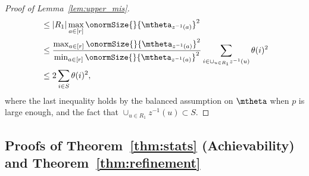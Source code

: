 \documentclass[lettersize,onecolumn,journal]{IEEEtran}
\theoremstyle{definition}
\theoremstyle{definition}
\begin{document}
\begin{proof}[Proof of Lemma~\ref{lem:upper_mis}]
\begin{align}
    & \leq |R_1| \max_{a \in [r]} \onormSize{}{\mtheta_{z^{-1}(a)}}^2  \\
    & \leq {\max_{a \in [r]} \onormSize{}{\mtheta_{z^{-1}(a)}}^2 \over \min_{a \in [r]} \onormSize{}{\mtheta_{z^{-1}(a)}}^2 } \sum_{i \in \cup_{u \in R_1} z^{-1}(u)} \theta(i)^2\\
    & \leq 2 \sum_{i \in S} \theta(i)^2,
\end{align}
where the last inequality holds by the balanced assumption on $\mtheta$ when $p$ is large enough, and the fact that $ \cup_{u \in R_1} z^{-1}(u) \subset S$.
\end{proof}


\subsection{Proofs of Theorem~\ref{thm:stats} (Achievability) and Theorem~\ref{thm:refinement}}\label{sec:statprove2}
\end{document}
